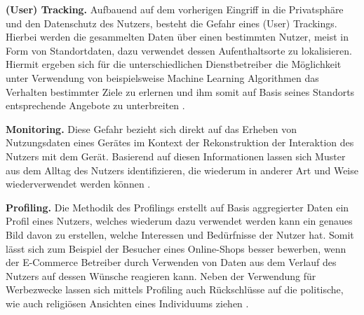 \noindent \textbf{(User) Tracking.}
Aufbauend auf dem vorherigen Eingriff in die Privatsphäre und den Datenschutz des Nutzers, besteht die Gefahr eines (User) Trackings. Hierbei werden die gesammelten Daten über einen bestimmten Nutzer, meist in Form von Standortdaten, dazu verwendet dessen Aufenthaltsorte zu lokalisieren. Hiermit ergeben sich für die unterschiedlichen Dienstbetreiber die Möglichkeit unter Verwendung von beispielsweise Machine Learning Algorithmen das Verhalten bestimmter Ziele zu erlernen und ihm somit auf Basis seines Standorts entsprechende Angebote zu unterbreiten \cite{Seliem2018}.


\noindent \textbf{Monitoring.}
Diese Gefahr bezieht sich direkt auf das Erheben von Nutzungsdaten eines Gerätes im Kontext der Rekonstruktion der Interaktion des Nutzers mit dem Gerät. Basierend auf diesen Informationen lassen sich Muster aus dem Alltag des Nutzers identifizieren, die wiederum in anderer Art und Weise wiederverwendet werden können \cite{Seliem2018}.


\noindent \textbf{Profiling.}
Die Methodik des Profilings erstellt auf Basis aggregierter Daten ein Profil eines Nutzers, welches wiederum dazu verwendet werden kann ein genaues Bild davon zu erstellen, welche Interessen und Bedürfnisse der Nutzer hat. Somit lässt sich zum Beispiel der Besucher eines Online-Shops besser bewerben, wenn der E-Commerce Betreiber durch Verwenden von Daten aus dem Verlauf des Nutzers auf dessen Wünsche reagieren kann. Neben der Verwendung für Werbezwecke lassen sich mittels Profiling auch Rückschlüsse auf die politische, wie auch religiösen Ansichten eines Individuums ziehen \cite{Seliem2018}.

